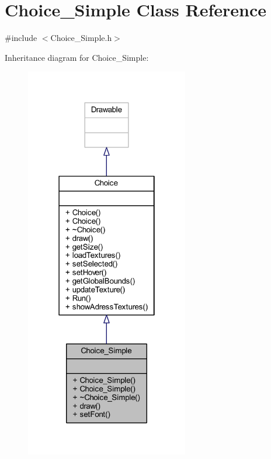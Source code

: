 \hypertarget{class_choice___simple}{}\section{Choice\+\_\+\+Simple Class Reference}
\label{class_choice___simple}


{\ttfamily \#include $<$Choice\+\_\+\+Simple.\+h$>$}



Inheritance diagram for Choice\+\_\+\+Simple\+:
\nopagebreak
\begin{figure}[H]
\begin{center}
\leavevmode
\includegraphics[width=202pt]{class_choice___simple__inherit__graph}
\end{center}
\end{figure}


